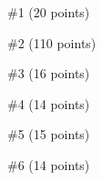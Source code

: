 \begin{problem}{\#1 (20 points)}

\end{problem}
\vspace{2em}
\begin{solution}

\end{solution}

\begin{problem}{\#2 (110 points)}

\end{problem}
\vspace{2em}
\begin{solution}

\end{solution}

\begin{problem}{\#3 (16 points)}

\end{problem}
\vspace{2em}
\begin{solution}

\end{solution}

\begin{problem}{\#4 (14 points)}

\end{problem}
\vspace{2em}
\begin{solution}

\end{solution}

\begin{problem}{\#5 (15 points)}

\end{problem}
\vspace{2em}
\begin{solution}

\end{solution}

\begin{problem}{\#6 (14 points)}

\end{problem}
\vspace{2em}
\begin{solution}

\end{solution}